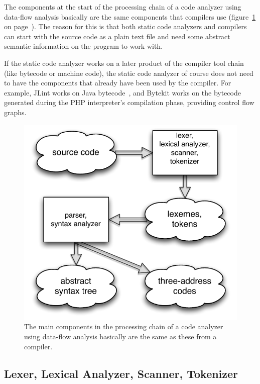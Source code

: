 The components at the start of the processing chain of a code analyzer using data-flow analysis basically are the same components that compilers use (figure~\ref{fig:compiler-parts} on page~\pageref{fig:compiler-parts}). The reason for this is that both static code analyzers and compilers can start with the source code as a plain text file and need some abstract semantic information on the program to work with.

If the static code analyzer works on a later product of the compiler tool chain (like bytecode or machine code), the static code analyzer of course does not need to have the components that already have been used by the compiler. For example, JLint works on Java bytecode~\cite{comparison-of-bug-finding-tools}, and Bytekit works on the bytecode generated during the PHP interpreter's compilation phase, providing control flow graphs.~\cite{bytekit, bytekit-cli}

\begin{figure}[htb]
  \begin{center}
    \includegraphics[scale=1.0]{images/compiler-parts}
    \caption{The main components in the processing chain of a code analyzer using data-flow analysis basically are the same as these from a compiler.}
    \label{fig:compiler-parts}
  \end{center}
\end{figure}


\subsection{Lexer, Lexical Analyzer, Scanner, Tokenizer}

